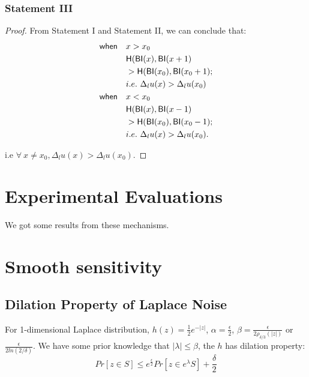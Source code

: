 \documentclass{article}
\begin{document}
\subsubsection{Statement III}
\begin{proof}
From Statement I and Statement II, we can conclude that:
\begin{equation*}
\begin{split}
\mathsf{when} \quad	& x > x_0 \\
					& \mathsf{H}(\mathsf{BI}(x), \mathsf{BI}(x + 1) \\
					& > \mathsf{H}(\mathsf{BI}(x_0), \mathsf{BI}(x_0 + 1); \\
					& i.e.\ \Delta_l u(x) > \Delta_l u(x_0)\\
\mathsf{when} \quad	& x < x_0 \\
					& \mathsf{H}(\mathsf{BI}(x), \mathsf{BI}(x - 1) \\
					& > \mathsf{H}(\mathsf{BI}(x_0), \mathsf{BI}(x_0 - 1); \\
					& i.e.\ \Delta_l u(x) > \Delta_l u(x_0).\\
\end{split}
\end{equation*}

i.e $\forall \ x \neq x_0, \Delta_l u(x) > \Delta_l u(x_0)$.

\end{proof}

\section{Experimental Evaluations}
We got some results from these mechanisms.

\section{Smooth sensitivity}
\label{sec_smoo}

\subsection{Dilation Property of Laplace Noise}
\label{sec_Dila}
\begin{lem}
For 1-dimensional Laplace distribution, $h(z) = \frac{1}{2} e^{-|z|}$, $\alpha = \frac{\epsilon}{2}$, $\beta = \frac{\epsilon}{2 \rho_{\delta/3}(|z|)}$ or $ \frac{\epsilon}{2 ln(2/\delta)}$. We have some prior knowledge that $|\lambda| \leq \beta$, the $h$ has dilation property:
\begin{equation*}
Pr[z \in S] \leq e^{\frac{\epsilon}{2}} Pr[z \in e^{\lambda} S] + \frac{\delta}{2}
\end{equation*}
\end{lem}
\end{document}
